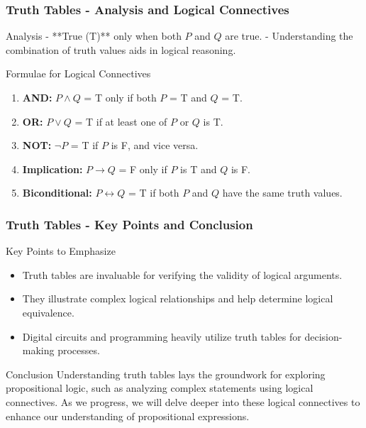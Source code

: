 \documentclass[aspectratio=169]{beamer}
\begin{document}
\begin{frame}[fragile]
    \frametitle{Truth Tables - Analysis and Logical Connectives}
    \begin{block}{Analysis}
        - **True (T)** only when both \( P \) and \( Q \) are true.
        - Understanding the combination of truth values aids in logical reasoning.
    \end{block}

    \begin{block}{Formulae for Logical Connectives}
        \begin{enumerate}
            \item \textbf{AND:} $P \land Q$ = T only if both $P$ = T and $Q$ = T.
            \item \textbf{OR:} $P \lor Q$ = T if at least one of $P$ or $Q$ is T.
            \item \textbf{NOT:} $\neg P$ = T if $P$ is F, and vice versa.
            \item \textbf{Implication:} $P \to Q$ = F only if $P$ is T and $Q$ is F.
            \item \textbf{Biconditional:} $P \leftrightarrow Q$ = T if both 
            $P$ and $Q$ have the same truth values.
        \end{enumerate}
    \end{block}
\end{frame}

\begin{frame}[fragile]
    \frametitle{Truth Tables - Key Points and Conclusion}
    \begin{block}{Key Points to Emphasize}
        \begin{itemize}
            \item Truth tables are invaluable for verifying the validity of logical arguments.
            \item They illustrate complex logical relationships and help determine logical equivalence.
            \item Digital circuits and programming heavily utilize truth tables for decision-making processes.
        \end{itemize}
    \end{block}
    
    \begin{block}{Conclusion}
        Understanding truth tables lays the groundwork for exploring propositional logic, such as analyzing complex statements using logical connectives. As we progress, we will delve deeper into these logical connectives to enhance our understanding of propositional expressions.
    \end{block}
\end{frame}
\end{document}
